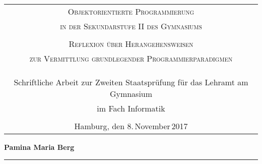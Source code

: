 
\begin{titlepage}
\enlargethispage{\baselineskip}

\vspace*{15ex} 
\begin{tabular}{c}

 \\
 \Large\textsc{Objektorientierte Programmierung}\\
\Large\textsc{in der Sekundarstufe II des Gymnasiums} \\
\tiny \\
\normalsize\textsc{Reflexion über Herangehensweisen}\\
\normalsize\textsc{zur Vermittlung grundlegender Programmierparadigmen}\\		  
\\
\\
\\
\normalsize Schriftliche Arbeit zur Zweiten Staatsprüfung für das Lehramt am Gymnasium \\
\normalsize im Fach Informatik\\
\\
\normalsize Hamburg, den 8.\,November\,2017

\end{tabular}

\vspace*{10ex}
	\noindent \textbf{Pamina Maria Berg}\\
	\noindent \rule{\textwidth}{0.4mm} 
	 \\	


\end{titlepage}
